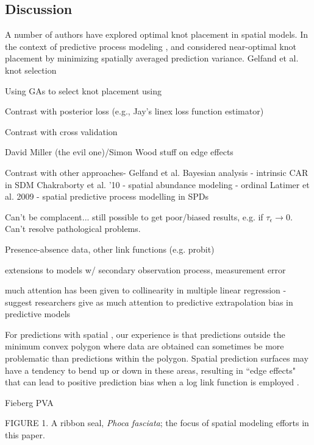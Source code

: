 \documentclass[12pt,english]{article}
\begin{document}
\begin{spacing}{1.9}
\section{Discussion}

A number of authors have explored optimal knot placement in spatial models.  In the context of predictive process modeling \citep[where a covariance function is specified over a group of knots; see][]{BanerjeeEtAl2008}, \citet{FinleyEtAl2009} and \citet{GelfandEtAl2013} considered near-optimal knot placement by minimizing spatially averaged prediction variance.
Gelfand et al. knot selection

Using GAs to select knot placement using


Contrast with posterior loss (e.g., Jay's linex loss function estimator)

Contrast with cross validation

David Miller (the evil one)/Simon Wood stuff on edge effects

Contrast with other approaches-
Gelfand et al. Bayesian analysis - intrinsic CAR in SDM
Chakraborty et al. '10 - spatial abundance modeling - ordinal
Latimer et al. 2009 - spatial predictive process modelling in SPDs

Can't be complacent... still possible to get poor/biased results, e.g. if $\tau_\epsilon \rightarrow 0$.  Can't resolve pathological problems.

Presence-absence data, other link functions (e.g. probit)

extensions to models w/ secondary observation process, measurement error

much attention has been given to collinearity in multiple linear regression - suggest researchers give as much attention to predictive extrapolation bias in predictive models

For predictions with spatial , our experience is that predictions outside the minimum convex polygon where data are obtained can sometimes be more problematic than predictions within the polygon.  Spatial prediction surfaces may have a tendency to bend up or down in these areas, resulting in ``edge effects" that can lead to positive prediction bias when a log link function is employed \citep{VerHoefJansen2007}.

Fieberg PVA




FIGURE 1. A ribbon seal, {\it Phoca fasciata}; the focus of spatial modeling efforts in this paper.


\end{spacing}
\end{document}

